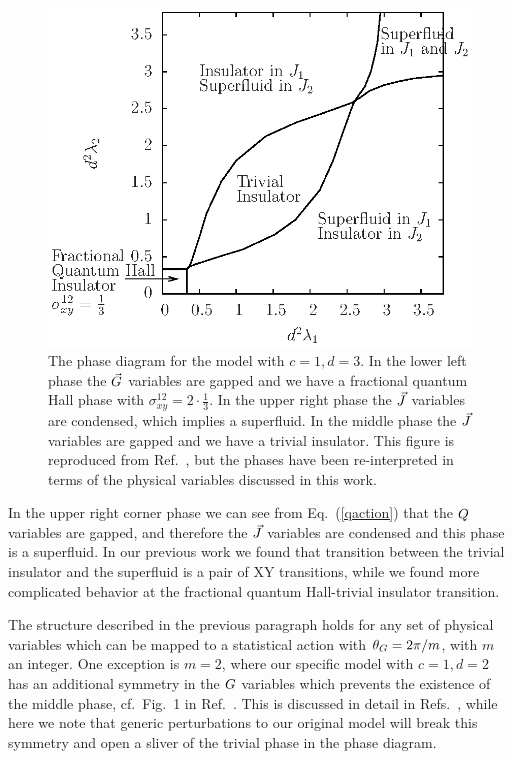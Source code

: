 \begin{figure}
\includegraphics[width=\linewidth]{figures/fracphase.eps}
\caption{The phase diagram for the model with $c=1,d=3$. In the lower left phase the $\vec{G}$ variables are gapped and we have a fractional quantum Hall phase with $\sigma^{12}_{xy}=2\cdot\frac{1}{3}$. In the upper right phase the $\vec{J}$ variables are condensed, which implies a superfluid. In the middle phase the $\vec{J}$ variables are gapped and we have a trivial insulator. This figure is reproduced from Ref.~\cite{short_range3}, but the phases have been re-interpreted in terms of the physical variables discussed in this work.}
\label{fracphase}
\end{figure}

In the upper right corner phase we can see from Eq.~(\ref{qaction}) that the $Q$ variables are gapped,  and therefore the $\vec{J}$ variables are condensed and this phase is a superfluid.  In our previous work\cite{short_range3} we found that transition between the trivial insulator and the superfluid is a pair of XY transitions, while we found more complicated behavior at the fractional quantum Hall-trivial insulator transition. 

The structure described in the previous paragraph holds for any set of physical variables which can be mapped to a statistical action with $\theta_G=2\pi/m$, with $m$ an integer. %
One exception is $m=2$, where our specific model with $c=1, d=2$ has an additional symmetry in the $G$ variables which prevents the existence of the middle phase, cf.~Fig.~1 in Ref.~\cite{Loopy}.  This is discussed in detail in Refs.~\cite{Loopy, Gen2Loops}, while here we note that generic perturbations to our original model will break this symmetry and open a sliver of the trivial phase in the phase diagram.

